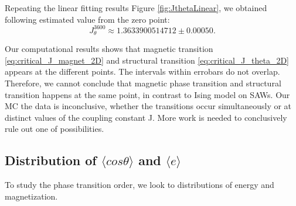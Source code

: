 
Repeating the linear fitting results Figure \ref{fig:JthetaLinear}, we obtained following estimated value from the zero point:
\begin{equation}
\label{eq:critical_J_theta_2D}
J_{\theta}^{3600} \approx  1.3633900514712 \pm 0.00050.
\end{equation}

 
  Our computational results shows that magnetic transition \eqref{eq:critical_J_magnet_2D} and structural transition \eqref{eq:critical_J_theta_2D} appears at the different points. The intervals within errobars do not overlap. Therefore, we cannot conclude that magnetic phase transition and structural transition happens at the same point, in contrast to Ising model on SAWs. Our MC the data is inconclusive, whether the transitions occur simultaneously or at distinct values of the coupling constant J. More work is needed to conclusively rule out one of possibilities.


 

\subsection{Distribution of $\langle cos \theta \rangle$ and $\langle e \rangle$ } \label{sec:distributions}
To study the phase transition order, we look to distributions of energy and magnetization.


